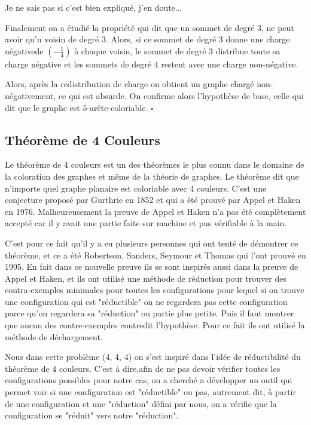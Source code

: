 \documentclass[10pt,a4paper]{article}
\newcommand{\ep}{{\hfill $\square$}}
\begin{document}
{\color{red} Je ne sais pas si c'est bien expliqué, j'en doute...}

Finalement on a étudié la propriété qui dit que un sommet de degré 3, ne peut avoir qu'n voisin de degré 3. Alors, si ce sommet de degré 3 donne une charge négativede $(-\frac{1}{4})$ à chaque voisin, le sommet de degré 3 distribue toute sa charge négative et les sommets de degré 4 restent avec une charge non-négative.

Alors, après la redistribution de charge on obtient un graphe chargé non-négativement, ce qui est absurde. On confirme alors l'hypothèse de base, celle qui dit que le graphe est $5$-arête-coloriable.
\ep 


\subsection{Théorème de 4 Couleurs}







Le théorème de 4 couleurs est un des théorèmes le plus connu dans le domaine de la coloration des graphes et même de la théorie de graphes. Le théorème dit que n'importe quel graphe planaire est coloriable avec 4 couleurs. C'est une conjecture proposé par Gurthrie en 1852 et qui a été prouvé par Appel et Haken en 1976. Malheureusement la preuve de Appel et Haken n'a pas été complètement accepté car il y avait une partie faite sur machine et pas vérifiable à la main.

C'est pour ce fait qu'il y a eu plusieurs personnes qui ont tenté de démontrer ce théorème, et ce a été Robertson, Sanders, Seymour et Thomas qui l'ont prouvé en 1995. En fait dans ce nouvelle preuve ils se sont inspirés aussi dans la preuve de Appel et Haken, et ils ont utilisé une méthode de réduction pour trouver des contra-exemples minimales pour toutes les configurations pour lequel si on trouve une configuration qui est "réductible" on ne regardera pas cette configuration parce qu'on regardera sa "réduction" ou partie plus petite. Puis il faut montrer que aucun des contre-exemples contredit l'hypothèse. Pour ce fait ils ont utilisé la méthode de déchargement.

Nous dans cette problème (4, 4, 4) on s'est inspiré dans l'idée de réductibilité du théorème de 4 couleurs. C'est à dire,afin de ne pas devoir vérifier toutes les configurations possibles pour notre cas, on a cherché a développer un outil qui permet voir si une configuration est "réductible" ou pas, autrement dit, à partir de une configuration et une "réduction" défini par nous, on a vérifie que la configuration se "réduit" vers notre "réduction".
\end{document}
